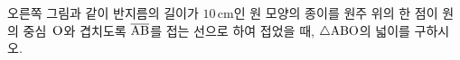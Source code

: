 \noindent\begin{minipage}[t]{0.58\linewidth}\vspace{0pt}\raggedright 오른쪽 그림과 같이 반지름의 길이가 $10\,\mathrm{cm}$인 원 모양의 종이를 원주 위의 한 점이 원의 중심~$\mathrm{O}$와 겹치도록 $\overline{\mathrm{AB}}$를 접는 선으로 하여 접었을 때, $\triangle\mathrm{ABO}$의 넓이를 구하시오.\end{minipage}\hfill\begin{minipage}[t]{0.4\linewidth}\vspace{0pt}\centering \resizebox{\ifdim\width>\linewidth\linewidth\else\width\fi}{!}{}\end{minipage}\par
